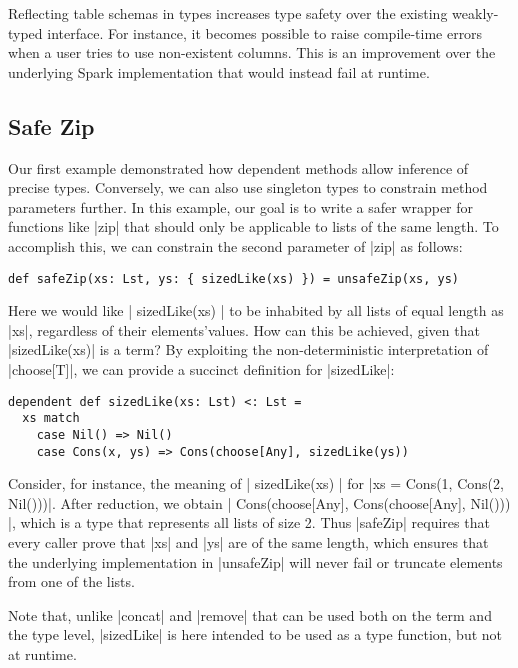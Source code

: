\noindent
Reflecting table schemas in types increases type safety over the existing weakly-typed interface.
For instance, it becomes possible to raise compile-time errors when a user tries to use non-existent columns.
This is an improvement over the underlying Spark implementation that would instead fail at runtime.

\subsection{Safe Zip}
\label{safe-zip}

Our first example demonstrated how dependent methods allow inference of precise types.
Conversely, we can also use singleton types to constrain method parameters further.
In this example, our goal is to write a safer wrapper for functions like |zip| that should only be applicable to lists of the same length.
To accomplish this, we can constrain the second parameter of |zip| as follows:

\begin{lstlisting}
def safeZip(xs: Lst, ys: { sizedLike(xs) }) = unsafeZip(xs, ys)
\end{lstlisting}

\noindent
Here we would like |{ sizedLike(xs) }| to be inhabited by all lists of equal length as |xs|, regardless of their elements'values.
How can this be achieved, given that |sizedLike(xs)| is a term? By exploiting the non-deterministic interpretation of |choose[T]|, we can provide a succinct definition for |sizedLike|:

\begin{lstlisting}
dependent def sizedLike(xs: Lst) <: Lst =
  xs match
    case Nil() => Nil()
    case Cons(x, ys) => Cons(choose[Any], sizedLike(ys))
\end{lstlisting}

\noindent
Consider, for instance, the meaning of |{ sizedLike(xs) }| for |xs = Cons(1, Cons(2, Nil()))|.
After reduction, we obtain |{ Cons(choose[Any], Cons(choose[Any], Nil())) }|, which is a type that represents all lists of size 2.
Thus |safeZip| requires that every caller prove that |xs| and |ys| are of the same length, which ensures that the underlying implementation in |unsafeZip| will never fail or truncate elements from one of the lists.

Note that, unlike |concat| and |remove| that can be used both on the term and the type level, |sizedLike| is here intended to be used as a type function, but not at runtime.

